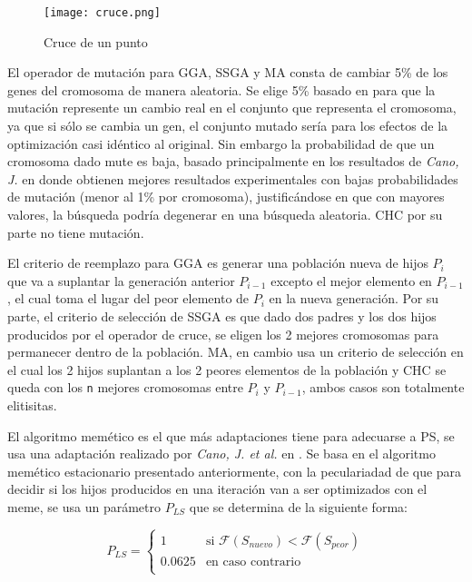 \begin{figure}[]
\centering
\texttt{[image: cruce.png]}
\caption[Cruce]{Cruce de un punto}
\label{cruce}
\end{figure}

El operador de mutación para GGA, SSGA y MA consta de cambiar 5\% de los genes del cromosoma de manera aleatoria. Se elige 5\%  basado en \cite{flores2014metaheuristics} para que la mutación represente un cambio real en el conjunto que representa el cromosoma, ya que si sólo se cambia un gen, el conjunto mutado sería para los efectos de la optimización casi idéntico al original. Sin embargo la probabilidad de que un cromosoma dado mute es baja, basado principalmente en los resultados de \emph{Cano, J.} en \cite{de2004reduccion} donde obtienen mejores resultados experimentales con bajas probabilidades de mutación (menor al 1\% por cromosoma), justificándose en que con mayores valores, la búsqueda podría degenerar en una búsqueda aleatoria. CHC por su parte no tiene mutación.

El criterio de reemplazo para GGA es generar una población nueva de hijos $P_i$ que va a suplantar la generación anterior $P_{i-1}$ excepto el mejor elemento en $P_{i-1}$, el cual toma el lugar del peor elemento de $P_i$ en la nueva generación. Por su parte, el criterio de selección de SSGA es que dado dos padres y los dos hijos producidos por el operador de cruce, se eligen los 2 mejores cromosomas para permanecer dentro de la población. MA, en cambio usa un criterio de selección en el cual los 2 hijos suplantan a los 2 peores elementos de la población y CHC se queda con los \texttt{n} mejores cromosomas entre $P_i$ y $P_{i-1}$, ambos casos son totalmente elitisitas.

El algoritmo memético es el que más adaptaciones tiene para adecuarse a PS, se usa una adaptación realizado por \emph{Cano, J. et al.} en \cite{garcia2008memetic}. Se basa en el algoritmo memético estacionario presentado anteriormente, con la peculariadad de que para decidir si los hijos producidos en una iteración van a ser optimizados con el meme, se usa un parámetro $P_{LS}$ que se determina de la siguiente forma:

\begin{equation}
P_{LS}=
\begin{cases}
1 & \text{si } \mathcal{F}(S_{nuevo}) < \mathcal{F}(S_{peor})\\
0.0625 & \text{en caso contrario}\\
\end{cases}
\end{equation}


